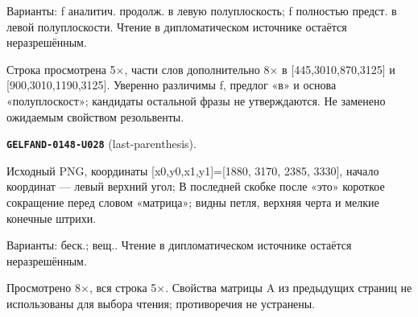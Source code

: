 \documentclass[11pt]{article}
\theoremstyle{definition}
\theoremstyle{remark}
\begin{document}
Варианты: f аналитич. продолж. в левую полуплоскость; f полностью предст. в левой полуплоскости. Чтение в дипломатическом источнике остаётся неразрешённым.\par
Строка просмотрена 5×, части слов дополнительно 8× в [445,3010,870,3125] и [900,3010,1190,3125]. Уверенно различимы f, предлог «в» и основа «полуплоскост»; кандидаты остальной фразы не утверждаются. Не заменено ожидаемым свойством резольвенты.\par\medskip
\noindent\leavevmode{}\label{GELFAND-P001365:last-parenthesis:note}\textbf{\texttt{GELFAND-0148-U028}} (last-parenthesis).\par\nopagebreak[4]
Исходный PNG, координаты [x0,y0,x1,y1]=[1880, 3170, 2385, 3330], начало координат — левый верхний угол; В последней скобке после «это» короткое сокращение перед словом «матрица»; видны петля, верхняя черта и мелкие конечные штрихи.\par
Варианты: беск.; вещ.. Чтение в дипломатическом источнике остаётся неразрешённым.\par
Просмотрено 8×, вся строка 5×. Свойства матрицы A из предыдущих страниц не использованы для выбора чтения; противоречия не устранены.\par\medskip
\end{document}
